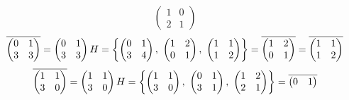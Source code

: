 \documentclass[11pt, fleqn]{article}
\begin{document}
\begin{enumerate}
\[{\begin{pmatrix}
          1 & 0\\
          2 & 1
      \end{pmatrix}}\]
      \[\overline{\begin{pmatrix}
          0 & 1\\
          3 & 3
      \end{pmatrix}} = \begin{pmatrix}
          0 & 1\\
          3 & 3
      \end{pmatrix} H = \left\{ \begin{pmatrix}
          0 & 1\\
          3 & 4
      \end{pmatrix},\ \begin{pmatrix}
          1 & 2\\
          0 & 1
      \end{pmatrix},\ \begin{pmatrix}
          1 & 1\\
          1 & 2
      \end{pmatrix} \right\} = \overline{\begin{pmatrix}
          1 & 2\\
          0 & 1
      \end{pmatrix}} = \overline{\begin{pmatrix}
          1 & 1\\
          1 & 2
      \end{pmatrix}}\]
      \[\overline{\begin{pmatrix}
          1 & 1\\
          3 & 0
      \end{pmatrix}} = \begin{pmatrix}
          1 & 1\\
          3 & 0
      \end{pmatrix} H = \left\{ \begin{pmatrix}
          1 & 1\\
          3 & 0
      \end{pmatrix},\ \begin{pmatrix}
          0 & 1\\
          3 & 1
      \end{pmatrix},\ \begin{pmatrix}
          1 & 2\\
          2 & 1
      \end{pmatrix} \right\} = \overline{\begin{pmatrix}
          0 & 1\\

\end{pmatrix}}\]
\end{enumerate}
\end{document}
